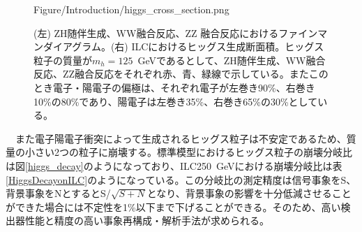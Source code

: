 \begin{figure}[H]
\begin{minipage}[h]{.45\linewidth}
 	{Figure/Introduction/higgs_cross_section.png}
\end{minipage}
\label{higgs_cs}
\caption{(左) ZH随伴生成、WW融合反応、ZZ 融合反応におけるファインマンダイアグラム。(右) ILCにおけるヒッグス生成断面積。ヒッグス粒子の質量が$m_h=125$\ GeVであるとして、ZH随伴生成、WW融合反応、ZZ融合反応をそれぞれ赤、青、緑線で示している。またこのとき電子・陽電子の偏極は、それぞれ電子が左巻き90\%、右巻き10\%の80\%であり、陽電子は左巻き35\%、右巻き65\%の30\%としている。}
\end{figure}
　また電子陽電子衝突によって生成されるヒッグス粒子は不安定であるため、質量の小さい2つの粒子に崩壊する。標準模型におけるヒッグス粒子の崩壊分岐比は図\ref{higgs_decay}のようになっており、ILC250\ GeVにおける崩壊分岐比は表\ref{HiggsDecayonILC}のようになっている。この分岐比の測定精度は信号事象をS、背景事象をNとするとS/$\sqrt{S+N}$となり、背景事象の影響を十分低減させることができた場合には不定性を1\%以下まで下げることができる。そのため、高い検出器性能と精度の高い事象再構成・解析手法が求められる。\\
